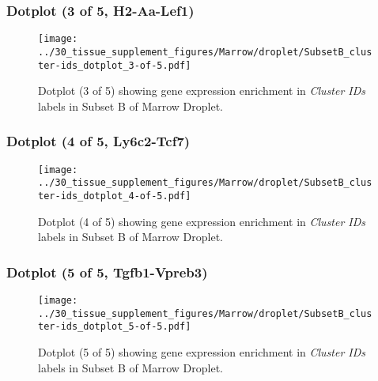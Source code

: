 \clearpage

\subsubsection{Dotplot (3 of 5, H2-Aa-Lef1)}
\begin{figure}[h]
\centering
\texttt{[image: ../30\_tissue\_supplement\_figures/Marrow/droplet/SubsetB\_cluster-ids\_dotplot\_3-of-5.pdf]}

\caption{ Dotplot (3 of 5)  showing gene expression enrichment in \emph{Cluster IDs} labels in Subset B of Marrow Droplet. }
\end{figure}


\clearpage

\subsubsection{Dotplot (4 of 5, Ly6c2-Tcf7)}
\begin{figure}[h]
\centering
\texttt{[image: ../30\_tissue\_supplement\_figures/Marrow/droplet/SubsetB\_cluster-ids\_dotplot\_4-of-5.pdf]}

\caption{ Dotplot (4 of 5)  showing gene expression enrichment in \emph{Cluster IDs} labels in Subset B of Marrow Droplet. }
\end{figure}


\clearpage

\subsubsection{Dotplot (5 of 5, Tgfb1-Vpreb3)}
\begin{figure}[h]
\centering
\texttt{[image: ../30\_tissue\_supplement\_figures/Marrow/droplet/SubsetB\_cluster-ids\_dotplot\_5-of-5.pdf]}

\caption{ Dotplot (5 of 5)  showing gene expression enrichment in \emph{Cluster IDs} labels in Subset B of Marrow Droplet. }
\end{figure}

